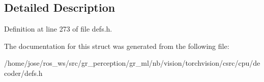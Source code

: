 \subsection{Detailed Description}


Definition at line 273 of file defs.\+h.



The documentation for this struct was generated from the following file\+:\begin{DoxyCompactItemize}
\item 
/home/jose/ros\+\_\+ws/src/gr\+\_\+perception/gr\+\_\+ml/nb/vision/torchvision/csrc/cpu/decoder/defs.\+h\end{DoxyCompactItemize}
